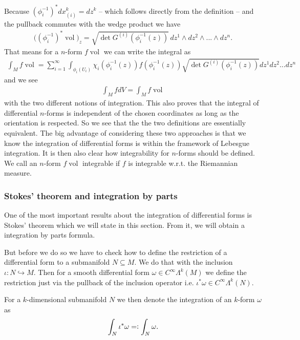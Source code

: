 \documentclass[12pt,a4paper]{article}
\numberwithin{equation}{subsection}
\numberwithin{lemma}{subsection}
\theoremstyle{definition}
\DeclareMathOperator{\vol}{vol}
\begin{document}
Because $(\phi_i^{-1})^* dx_{(i)}^k = dz^k$ -- which follows directly from the 
definition -- and the pullback commutes with the wedge product we have
\begin{align*}
    \big( (\phi_i^{-1})^* \vol)_z =  
        \sqrt{ \det G^{(i)}(\phi_i^{-1}(z))} \,
        dz^1 \wedge dz^2 \wedge ... \wedge dz^n.
\end{align*}
That means for a $n$-form $f \vol$ we can write the integral as
\begin{align*}
    \int_M f \vol = \sum_{i=1}^\infty \int_{\phi_i(U_i)} 
    \chi_i(\phi_i^{-1}(z)) f(\phi_i^{-1}(z))
        \sqrt{ \det G^{(i)}(\phi_i^{-1}(z))} dz^1 dz^2 ... dz^n
\end{align*} 
and we see 
\begin{align*}
    \int_M f dV = \int_M f \vol
\end{align*}
with the two different notions of integration. This also proves that 
the integral of differential $n$-forms is independent of the chosen 
coordinates as long as the orientation is respected. So we see that the
the two definitions are essentially equivalent.
The big advantage of considering these two
approaches is that we know the integration of 
differential forms is within the framework of Lebesgue integration. 
It is then also 
clear how integrability for $n$-forms should be defined. We call an 
$n$-form $f \vol$ integrable if $f$ is integrable w.r.t. the Riemannian measure.

\subsubsection{Stokes' theorem and integration by parts} 

One of the most important results about the integration of differential forms
is Stokes' theorem which we will state in this section. From it, we will 
obtain a integration by parts formula.

But before we do so we have to check how to define the restriction of a
differential form to a submanifold $N \subseteq M$. 
We do that with the inclusion $\iota: N \hookrightarrow M$. Then for a 
smooth differential form $\omega \in C^\infty \Lambda^k (M)$ we define 
the restriction just via the pullback of the inclusion operator i.e. 
$\iota^* \omega \in C^\infty \Lambda^k(N)$. 

For a $k$-dimensional submanifold $N$ we then denote the integration of an 
$k$-form $\omega$ as
\begin{align*}
    \int_N \iota^*\omega =\vcentcolon \int_N \omega.
\end{align*} 
\end{document}
